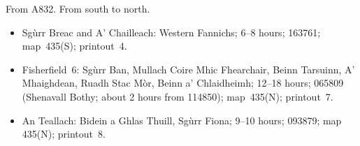 \documentclass[12pt,a4paper]{article}
\begin{document}

From A832.  From south to north.
%
\begin{itemize}

\item Sgùrr Breac and A' Chailleach: Western Fannichs; 6--8 hours; 163761;
  map~435(S); printout~4.

\item Fisherfield~6: Sgùrr Ban, Mullach Coire Mhic Fhearchair, Beinn Tarsuinn,
  A' Mhaighdean, Ruadh Stac Mòr, Beinn a' Chlaidheimh; 12--18 hours; 065809
  (Shenavall Bothy; about 2 hours from 114850); map~435(N); printout~7.

\item An Teallach: Bidein a Ghlas Thuill, Sgùrr Fiona; 9--10 hours; 093879;
  map 435(N); printout~8.
\end{itemize}



\end{document}
